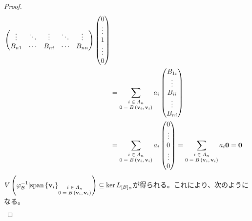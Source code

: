 \documentclass[dvipdfmx]{jsarticle}
\begin{document}
\begin{proof}
\begin{align*}
{\begin{pmatrix}
 \vdots & \ddots & \vdots & \ddots & \vdots \\
B_{n1} & \cdots & B_{ni} & \cdots & B_{nn} \\
\end{pmatrix}\begin{pmatrix}
0 \\
 \vdots \\
1 \\
 \vdots \\
0 \\
\end{pmatrix}}\\
&= \sum_{\scriptsize \begin{matrix} i \in \varLambda_{n} \\0 = B\left( \mathbf{v}_{i},\mathbf{v}_{i} \right) \end{matrix}} {a_{i}\begin{pmatrix}
B_{1i} \\
 \vdots \\
B_{ii} \\
 \vdots \\
B_{ni} \\
\end{pmatrix}}\\
&= \sum_{\scriptsize \begin{matrix} i \in \varLambda_{n} \\0 = B\left( \mathbf{v}_{i},\mathbf{v}_{i} \right) \end{matrix}} {a_{i}\begin{pmatrix}
0 \\
 \vdots \\
0 \\
 \vdots \\
0 \\
\end{pmatrix}} = \sum_{\scriptsize \begin{matrix} i \in \varLambda_{n} \\0 = B\left( \mathbf{v}_{i},\mathbf{v}_{i} \right) \end{matrix}} {a_{i}\mathbf{0}} = \mathbf{0}
\end{align*}
$V\left( \varphi_{\mathcal{B}}^{- 1}|{\mathrm{span}}\left\{ \mathbf{v}_{i} \right\}_{\scriptsize \begin{matrix} i \in \varLambda_{n} \\0 = B\left( \mathbf{v}_{i},\mathbf{v}_{i} \right) \end{matrix}} \right) \subseteq \ker L_{[ B]_{\mathcal{B}}}$が得られる。これにより、次のようになる。
\begin{align*}

\end{align*}
\end{proof}
\end{document}
